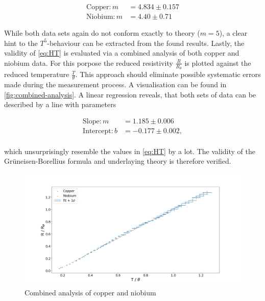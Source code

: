 \begin{align*}
\label{eq:fitparams-slope-metal}
\text{Copper}: m &= 4.834 \pm 0.157 \\
\text{Niobium}: m &= 4.40 \pm 0.71
\end{align*}

While both data sets again do not conform exactly to theory ($m=5$), a clear hint to the $T^5$-behaviour can be extracted from the found results. Lastly, the validity of
\autoref{eq:HT} is evaluated via a combined analysis of both copper and niobium data.
For this porpose the reduced resistivity $\frac{R}{R_\theta}$ is plotted against the
reduced temperature $\frac{T}{\theta}$. This approach should eliminate possible
systematic errors made during the measurement process. A visualisation can be found 
in \autoref{fig:combined-analysis}. A linear regression reveals, that both sets of
data can be described by a line with parameters 

\begin{align*}
\text{Slope}: m &= 1.185\pm0.006 \\
\text{Intercept}: b &= -0.177\pm0.002, \\ 
\end{align*}

which unsurprisingly resemble the values in \autoref{eq:HT} by a lot. The validity of
the Grüneisen-Borellius formula and underlaying theory is therefore verified.

\begin{figure}
	\centering
	\includegraphics[width=1.0\textwidth]{./fig/combined_analysis.png}
	\caption{Combined analysis of copper and niobium}
	\label{fig:combined-analysis}
\end{figure}



